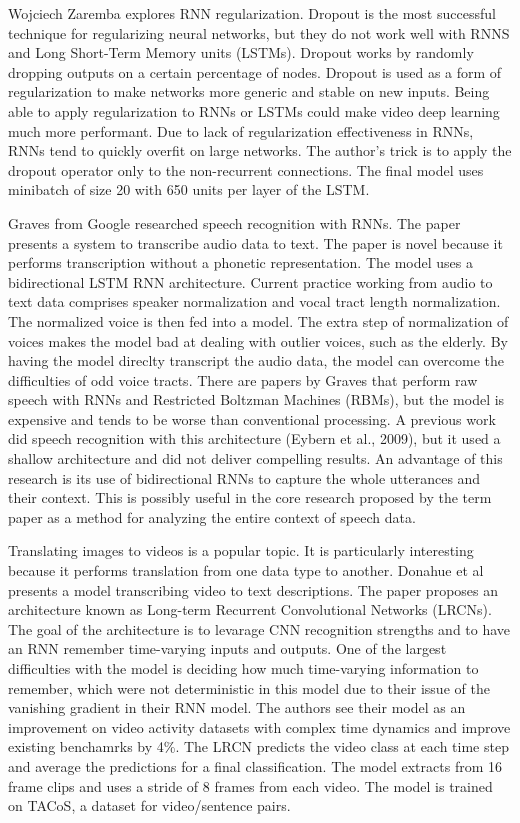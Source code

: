 Wojciech Zaremba explores RNN regularization.  Dropout is the most successful technique for regularizing neural networks, but they do not work well with RNNS and Long Short-Term Memory units (LSTMs).  Dropout works by randomly dropping outputs on a certain percentage of nodes.  Dropout is used as a form of regularization to make networks more generic and stable on new inputs.  Being able to apply regularization to RNNs or LSTMs could make video deep learning much more performant.  Due to lack of regularization effectiveness in RNNs, RNNs tend to quickly overfit on large networks.  The author's trick is to apply the dropout operator only to the non-recurrent connections.  The final model uses minibatch of size 20 with 650 units per layer of the LSTM.


Graves from Google researched speech recognition with RNNs.  The paper presents a system to transcribe audio data to text.  The paper is novel because it performs transcription without a phonetic representation.  The model uses a bidirectional LSTM RNN architecture.  Current practice working from audio to text data comprises speaker normalization and vocal tract length normalization.  The normalized voice is then fed into a model.  The extra step of normalization of voices makes the model bad at dealing with outlier voices, such as the elderly.  By having the model direclty transcript the audio data, the model can overcome the difficulties of odd voice tracts.  There are papers by Graves that perform raw speech with RNNs and Restricted Boltzman Machines (RBMs), but the model is expensive and tends to be worse than conventional processing.  A previous work did speech recognition with this architecture (Eybern et al., 2009), but it used a shallow architecture and did not deliver compelling results. An advantage of this research is its use of bidirectional RNNs to capture the whole utterances and their context.  This is possibly useful in the core research proposed by the term paper as a method for analyzing the entire context of speech data.

Translating images to videos is a popular topic.  It is particularly interesting because it performs translation from one data type to another.  Donahue et al presents a model transcribing video to text descriptions.  The paper proposes an architecture known as Long-term Recurrent Convolutional Networks (LRCNs).  The goal of the architecture is to levarage CNN recognition strengths and to have an RNN remember time-varying inputs and outputs. One of the largest difficulties with the model is deciding how much time-varying information to remember, which were not deterministic in this model due to their issue of the vanishing gradient in their RNN model.  The authors see their model as an improvement on video activity datasets with complex time dynamics and improve existing benchamrks by 4\%.  The LRCN predicts the video class at each time step and average the predictions for a final classification.  The model extracts from 16 frame clips and uses a stride of 8 frames from each video.  The model is trained on TACoS, a dataset for video/sentence pairs.

